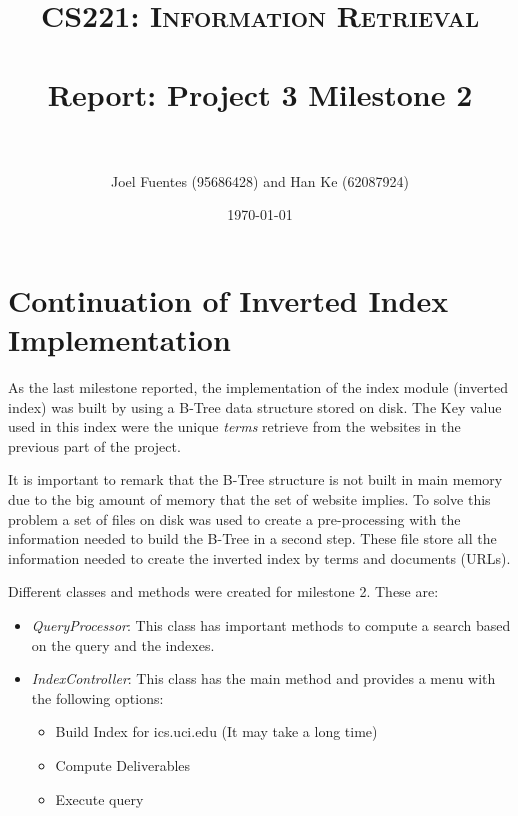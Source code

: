 \documentclass[paper=a4, fontsize=11pt]{scrartcl} %
\title{	
\normalfont \normalsize 
\textsc{CS221: Information Retrieval} \\ [25pt] %
\horrule{0.5pt} \\[0.4cm] %
\huge Report: Project 3 Milestone 2 \\ %
\horrule{2pt} \\[0.5cm] %
}
\author{Joel Fuentes (95686428)  and Han Ke (62087924)} %
\date{\normalsize\today} %
\numberwithin{equation}{section} %
\numberwithin{table}{section} %
\begin{document}
\maketitle 

\section*{Continuation of Inverted Index Implementation}
As the last milestone reported, the implementation of the index module (inverted index) was built by using a B-Tree data structure stored on disk. The Key value used in this index were the unique \textit{terms} retrieve from the websites in the previous part of the project.

It is important to remark that the B-Tree structure is not built in main memory due to the big amount of memory that the set of website implies. To solve this problem a set of files on disk was used to create a pre-processing with the information needed to build the B-Tree in a second step. These file store all the information needed to create the inverted index by terms and documents (URLs). 



Different classes and methods were created for milestone 2. These are:
\begin{itemize}
\item \textit{QueryProcessor}: This class has important methods to compute a search based on the query and the indexes.
\item \textit{IndexController}: This class has the main method and provides a menu with the following options:
\begin{itemize}
\item Build Index for ics.uci.edu (It may take a long time)
\item Compute Deliverables
\item Execute query
\end{itemize}
\end{itemize}
\end{document}
